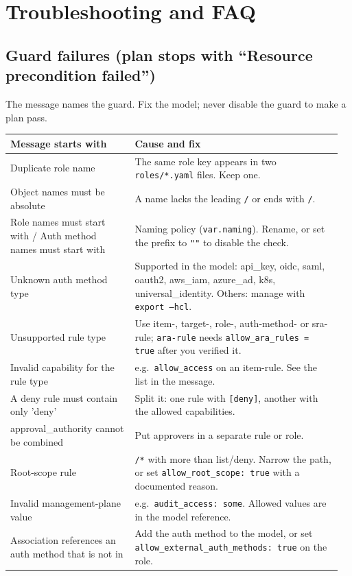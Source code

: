 \chapter{Troubleshooting and FAQ}\label{ch:troubleshooting}

\section{Guard failures (plan stops with ``Resource precondition failed'')}
The message names the guard. Fix the model; never disable the guard to make a plan pass.
{\small
\begin{longtable}{@{}>{\raggedright\arraybackslash}p{0.36\linewidth}>{\raggedright\arraybackslash}p{0.6\linewidth}@{}}
\toprule
\textbf{Message starts with} & \textbf{Cause and fix} \\ \midrule\endhead
Duplicate role name & The same role key appears in two \texttt{roles/*.yaml} files. Keep one. \\
Object names must be absolute & A name lacks the leading \texttt{/} or ends with \texttt{/}. \\
Role names must start with / Auth method names must start with & Naming policy (\texttt{var.naming}). Rename, or set the prefix to \texttt{""} to disable the check. \\
Unknown auth method type & Supported in the model: api\_key, oidc, saml, oauth2, aws\_iam, azure\_ad, k8s, universal\_identity. Others: manage with \texttt{export --hcl}. \\
Unsupported rule type & Use item-, target-, role-, auth-method- or sra-rule; \texttt{ara-rule} needs \texttt{allow\_ara\_rules = true} after you verified it. \\
Invalid capability for the rule type & e.g.\ \texttt{allow\_access} on an item-rule. See the list in the message. \\
A deny rule must contain only 'deny' & Split it: one rule with \texttt{[deny]}, another with the allowed capabilities. \\
approval\_authority cannot be combined & Put approvers in a separate rule or role. \\
Root-scope rule & \texttt{/*} with more than list/deny. Narrow the path, or set \texttt{allow\_root\_scope: true} with a documented reason. \\
Invalid management-plane value & e.g.\ \texttt{audit\_access: some}. Allowed values are in the model reference. \\
Association references an auth method that is not in & Add the auth method to the model, or set \texttt{allow\_external\_auth\_methods: true} on the role. \\

\end{longtable}}
